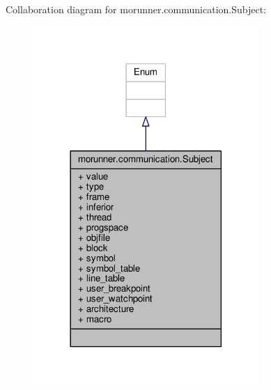 Collaboration diagram for morunner.\+communication.\+Subject\+:
\nopagebreak
\begin{figure}[H]
\begin{center}
\leavevmode
\includegraphics[width=242pt]{classmorunner_1_1communication_1_1Subject__coll__graph}
\end{center}
\end{figure}
